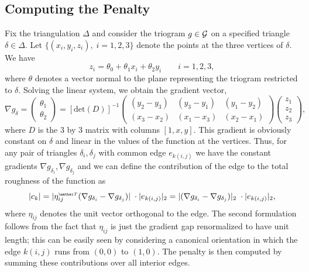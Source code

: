 \subsection{Computing the Penalty}
Fix the triangulation $\Delta$ and consider the triogram $g \in \mathcal{G}$
on a specified triangle $\delta \in \Delta$.  
Let $\{ ( x_i,y_i,z_i ), \; i=1,2,3 \}$
denote the points at the three vertices of $\delta$.  We have
\[
z_i = \theta_0 + \theta_1 x_i + \theta_2 y_i \quad \quad i=1,2,3,
\]
where $\theta$ denotes a vector normal to the plane representing the
triogram restricted to $\delta$.  Solving the linear system, we obtain
the gradient vector,
\[
\nabla g_{\delta} = 
\left( \begin{array}{c}\theta_1 \\ \theta_2 \end{array} \right)
= [\text{det}(D)]^{-1}
\left( \begin{array}{ccc}
(y_2 - y_3) & (y_3 - y_1) & (y_1 - y_2) \\
(x_3 - x_2) & (x_1 - x_3) & (x_2 - x_1) 
\end{array} \right)
 \left( \begin{array}{c}z_1 \\ z_2 \\ z_3 \end{array} \right),
\]
where $D$ is the 3 by 3 matrix with columns $[ 1, x, y ]$.
This gradient is obviously constant on $\delta$ and linear in the values of
the function at the vertices.  Thus, for any pair of triangles
$\delta_i , \delta_j$ with common edge $e_{k(i,j)}$ we have the
constant gradients $\nabla g_{\delta_i}, \nabla g_{\delta_j}$ and we
can define the contribution of the edge to the total roughness of
the function as
\[
| c_k | = | \eta_{ij} \trans (\nabla g_{\delta_i} - \nabla g_{\delta_j} ) |
\; \cdot  | e_{k(i,j)}  |_2
=  | (\nabla g_{\delta_i} - \nabla g_{\delta_j} )  |_2
\; \cdot  |  e_{k(i,j)}  |_2,
\]
where $\eta_{ij}$ denotes the unit vector orthogonal to the edge.
The second formulation follows from the fact that $\eta_{ij}$ is
just the gradient gap renormalized to have unit length; this
can be easily seen by considering a canonical orientation in which
the edge $k(i,j)$ runs from $(0,0)$ to $(1,0)$.
The penalty is then computed by summing these contributions over
all interior edges.


